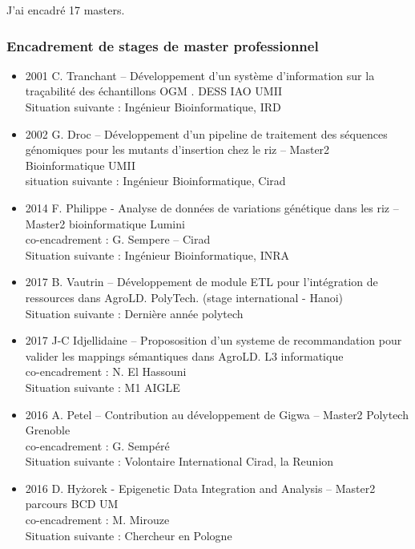 J’ai encadré 17 masters.
\subsubsection*{Encadrement de stages de master professionnel}
\begin{itemize}
\item 2001 C. Tranchant – Développement d’un système d’information sur la traçabilité des échantillons OGM . DESS IAO UMII \\
Situation suivante : Ingénieur Bioinformatique, IRD

\item 2002 G. Droc – Développement d’un pipeline de traitement des séquences génomiques pour les mutants d’insertion chez le riz – Master2 Bioinformatique UMII\\
situation suivante : Ingénieur Bioinformatique, Cirad

\item 2014 F. Philippe -  Analyse de données de variations génétique dans les riz – Master2 bioinformatique Lumini \\
co-encadrement : G. Sempere – Cirad \\
Situation suivante : Ingénieur Bioinformatique, INRA

\item 2017 B. Vautrin – Développement de module ETL pour l’intégration de ressources dans AgroLD. PolyTech. (stage international - Hanoi) \\
Situation suivante : Dernière année polytech 

\item 2017 J-C Idjellidaine – Propososition d’un systeme de recommandation pour valider les mappings sémantiques dans AgroLD. L3 informatique \\
co-encadrement : N. El Hassouni \\
Situation suivante : M1 AIGLE 

\item 2016 A. Petel – Contribution au développement de Gigwa – Master2 Polytech Grenoble \\
co-encadrement : G. Sempéré \\
Situation suivante : Volontaire International Cirad, la Reunion

\item 2016 D. Hyżorek - Epigenetic Data Integration and Analysis – Master2 parcours BCD UM \\
co-encadrement : M. Mirouze \\
Situation suivante : Chercheur en Pologne
\end{itemize}


